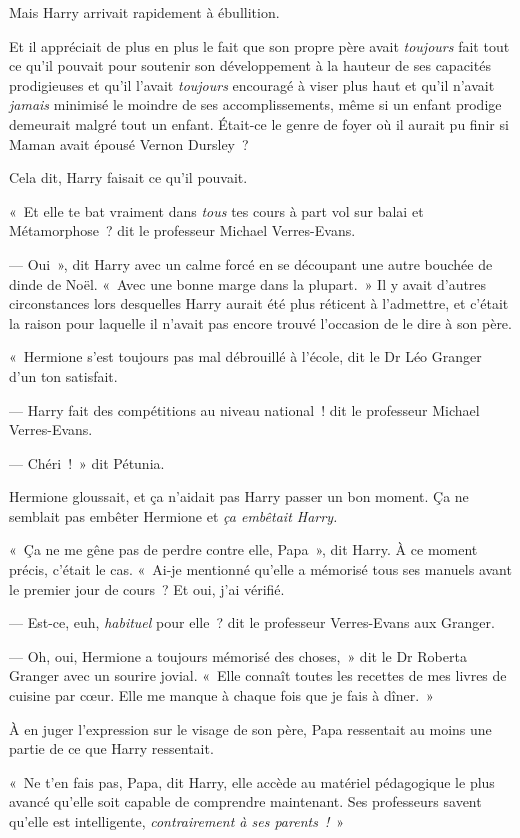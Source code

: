 Mais Harry arrivait rapidement à ébullition.

Et il appréciait de plus en plus le fait que son propre père avait \emph{toujours} fait tout ce qu'il pouvait pour soutenir son développement à la hauteur de ses capacités prodigieuses et qu'il l'avait \emph{toujours} encouragé à viser plus haut et qu'il n'avait \emph{jamais} minimisé le moindre de ses accomplissements, même si un enfant prodige demeurait malgré tout un enfant. Était-ce le genre de foyer où il aurait pu finir si Maman avait épousé Vernon Dursley~?

Cela dit, Harry faisait ce qu'il pouvait.

«~Et elle te bat vraiment dans \emph{tous} tes cours à part vol sur balai et Métamorphose~? dit le professeur Michael Verres-Evans.

--- Oui~», dit Harry avec un calme forcé en se découpant une autre bouchée de dinde de Noël. «~Avec une bonne marge dans la plupart.~» Il y avait d'autres circonstances lors desquelles Harry aurait été plus réticent à l'admettre, et c'était la raison pour laquelle il n'avait pas encore trouvé l'occasion de le dire à son père.

«~Hermione s'est toujours pas mal débrouillé à l'école, dit le Dr Léo Granger d'un ton satisfait.

--- Harry fait des compétitions au niveau national~! dit le professeur Michael Verres-Evans.

--- Chéri~!~» dit Pétunia.

Hermione gloussait, et ça n'aidait pas Harry passer un bon moment. Ça ne semblait pas embêter Hermione et \emph{ça embêtait Harry.}

«~Ça ne me gêne pas de perdre contre elle, Papa~», dit Harry. À ce moment précis, c'était le cas. «~Ai-je mentionné qu'elle a mémorisé tous ses manuels avant le premier jour de cours~? Et oui, j'ai vérifié.

--- Est-ce, euh, \emph{habituel} pour elle~? dit le professeur Verres-Evans aux Granger.

--- Oh, oui, Hermione a toujours mémorisé des choses,~» dit le Dr Roberta Granger avec un sourire jovial. «~Elle connaît toutes les recettes de mes livres de cuisine par cœur. Elle me manque à chaque fois que je fais à dîner.~»

À en juger l'expression sur le visage de son père, Papa ressentait au moins une partie de ce que Harry ressentait.

«~Ne t'en fais pas, Papa, dit Harry, elle accède au matériel pédagogique le plus avancé qu'elle soit capable de comprendre maintenant. Ses professeurs savent qu'elle est intelligente, \emph{contrairement à ses parents~!}~»

